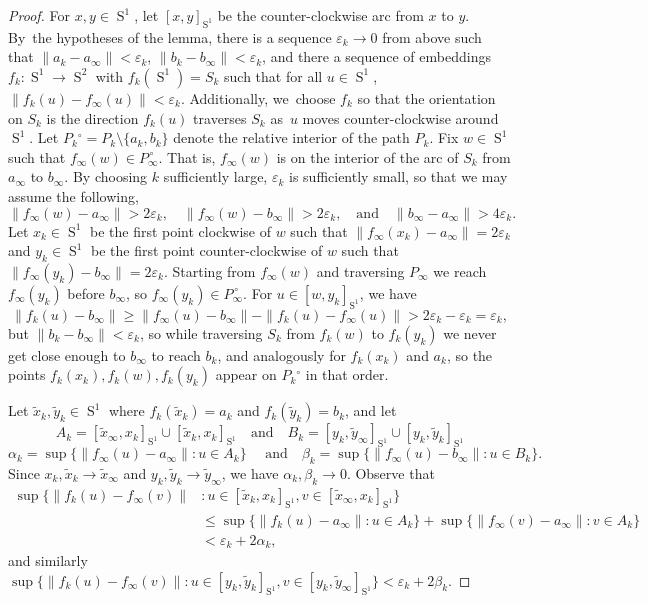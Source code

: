 \documentclass[11pt]{article}
\numberwithin{equation}{section}
\theoremstyle{remark}
\let\eps\varepsilon
\DeclareMathOperator{\sphere}{S}
\begin{document}
\begin{proof}
For $x,y \in \sphere^1$, let $[x,y]_{\sphere^1}$ be the counter-clockwise arc from $x$ to $y$.
By~the hypotheses of the lemma, there is a sequence $\eps_k \to 0$ from above such that \hbox{$\|a_k - a_\infty\| < \eps_k$}, $\|b_k - b_\infty\| < \eps_k$,
and there a sequence of embeddings $f_k : \sphere^1 \to \sphere^2$ with $f_k(\sphere^1) = S_k$
such that for all $u \in \sphere^1$, $\|f_k(u) - f_\infty(u)\| < \eps_k $.
Additionally, we~choose $f_k$ so that the orientation on $S_k$ is the direction $f_k(u)$ traverses $S_k$ as~$u$ moves counter-clockwise around $\sphere^1$.
Let $P_k{}^\circ = P_k\setminus\{a_k,b_k\}$ denote the relative interior of the path $P_k$.
Fix $w \in \sphere^1$ such that ${f_\infty(w) \in P_\infty^{\,\circ}}$.
That is, $f_\infty(w)$ is on the interior of the arc of $S_k$ from $a_\infty$ to $b_\infty$.
By choosing $k$ sufficiently large, $\eps_{k}$ is sufficiently small, so that we may assume the following,
\[
\|f_\infty(w) -a_\infty\| > 2\eps_{k}, \quad
\|f_\infty(w) -b_\infty\| > 2\eps_{k}, \quad \text{and} \quad
\|b_\infty - a_\infty\| > 4\eps_k.
\]
Let $x_k \in \sphere^1$ be the first point clockwise of $w$ such that
$\|f_\infty(x_k) - a_\infty\| = 2\eps_k$
and $y_k \in \sphere^1$ be the first point counter-clockwise of $w$ such that
$\|f_\infty(y_k) - b_\infty\| = 2\eps_k$.
Starting from $f_\infty(w)$ and traversing $P_\infty$ we reach $f_\infty(y_k)$ before $b_\infty$, so
$f_\infty(y_k) \in P_\infty^{\,\circ}$.
For $u \in [w,y_k]_{\sphere^1}$, we have
\[ \|f_k(u) - b_\infty\| \geq \| f_\infty(u) - b_\infty \| - \|f_k(u) -f_\infty(u)\| > 2\eps_k -\eps_k = \eps_k, \]
but $\|b_k - b_\infty\| < \eps_k$, so while traversing $S_k$ from $f_k(w)$ to $f_k(y_k)$ we never get close enough to $b_\infty$ to reach $b_k$,
and analogously for $f_k(x_k)$ and $a_k$,
so the points $f_k(x_k),f_k(w),f_k(y_k)$ appear on $P_k{}^\circ$ in that order.

Let $\tilde x_k, \tilde y_k \in \sphere^1$ where $f_k (\tilde x_k) = a_k$ and $f_k (\tilde y_k) = b_k$, and
let
\[ A_k = [\tilde x_\infty,x_k]_{\sphere^1} \cup [\tilde x_k,x_k]_{\sphere^1} \quad \text{and}\quad
B_k = [y_k, \tilde y_\infty]_{\sphere^1} \cup [y_k, \tilde y_k]_{\sphere^1}
\]
\[ \alpha_k = \sup \{ \|f_\infty(u)-a_\infty\| :u \in A_k \} \quad \text{ and} \quad
\beta_k = \sup \{ \|f_\infty(u)-b_\infty\| :u \in B_k \}.
\]
Since $x_k,\tilde x_k \to \tilde x_\infty$ and $y_k, \tilde y_k \to \tilde y_\infty$, we have $\alpha_k,\beta_k \to 0$. Observe that
\begin{align*}
\sup \{ \|f_k(u)-f_\infty(v)\| &:u \in [\tilde x_k,x_k]_{\sphere^1},v \in [\tilde x_\infty,x_k]_{\sphere^1} \} \\
& \leq \sup \{ \|f_k(u) -a_\infty \| : u \in A_k \} + \sup \{ \|f_\infty(v) -a_\infty \| : v \in A_k \} \\
& < \eps_k +2\alpha_k,
\end{align*}
and similarly
$\sup \{ \|f_k(u)-f_\infty(v)\| :u \in [y_k,\tilde y_k]_{\sphere^1},v \in [y_k,\tilde y_\infty]_{\sphere^1} \} < \eps_k +2\beta_k $.


\end{proof}
\end{document}

